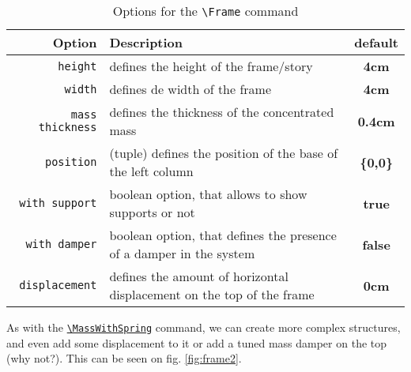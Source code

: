 \documentclass[10pt,letterpaper,oneside]{book}
\begin{document}
\begin{table}[!ht]
  \centering
  \caption{Options for the \texttt{\textbackslash Frame} command}
  \vspace{-10pt}
  \begin{tabular}{r p{9cm} |c}\toprule
    Option & Description & default \\\midrule
    \texttt{height} & defines the height of the frame/story & \textbf{4cm}                                      \\
    \texttt{width}  & defines de width of the frame & \textbf{4cm}                                              \\
    \texttt{mass thickness} & defines the thickness of the concentrated mass & \textbf{0.4cm}                   \\
    \texttt{position} & (tuple) defines the position of the base of the left column & \textbf{\{0,0\}}          \\
    \texttt{with support} & boolean option, that allows to show supports or not & \textbf{true}                 \\
    \texttt{with damper} & boolean option, that defines the presence of a damper in the system & \textbf{false} \\
    \texttt{displacement} & defines the amount of horizontal displacement on the top of the frame & \textbf{0cm}\\\bottomrule
  \end{tabular}
  \label{tab:frameOptions}
\end{table}

As with the \hyperref[subsection:MassWithSpring]{\texttt{\textbackslash MassWithSpring}} command, we can create more complex structures, and even add some displacement to it or add a tuned mass damper on the top (why not?). This can be seen on fig. \ref{fig:frame2}.\par
\end{document}

